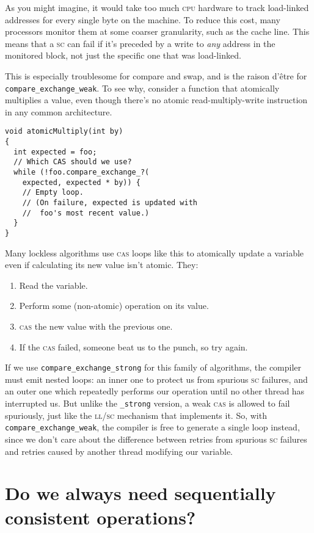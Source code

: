 \documentclass[fontsize=\bodyfontsize, numbers=endperiod]{scrartcl}
\newcommand{\codesize}{\fontsize{\bodyfontsize}{\bodybaselineskip}}
\newcommand{\monobox}[1]{\mbox{\texttt{#1}}}
\newenvironment{colfigure}
  {\par\vspace{1\baselineskip minus 0.5\baselineskip}\noindent\minipage{\linewidth}}
  {\endminipage\vspace{1\baselineskip minus 0.7\baselineskip}}
\begin{document}
\begin{multicols}{2}
As you might imagine, it would take too much \textsc{cpu} hardware to track
load-linked addresses for every single byte on the machine.
To reduce this cost, many processors monitor them at some coarser granularity,
such as the cache line.
This means that a \textsc{sc}
can fail if it's preceded by a write to \emph{any} address in the monitored block,
not just the specific one that was load-linked.

This is especially troublesome for compare and swap,
and is the raison d'être for \monobox{compare\_exchange\_weak}.
To see why, consider a function that atomically multiplies a value,
even though there's no atomic read-multiply-write instruction in any
common architecture.
\begin{colfigure}
\begin{verbatim}
void atomicMultiply(int by)
{
  int expected = foo;
  // Which CAS should we use?
  while (!foo.compare_exchange_?(
    expected, expected * by)) {
    // Empty loop.
    // (On failure, expected is updated with
    //  foo's most recent value.)
  }
}
\end{verbatim}
\end{colfigure}
Many lockless algorithms use \textsc{cas} loops like this to atomically update
a variable even if calculating its new value isn't atomic. They:
\begin{enumerate}
\item Read the variable.
\item Perform some (non-atomic) operation on its value.
\item \textsc{cas} the new value with the previous one.
\item If the \textsc{cas} failed, someone beat us to the punch, so try again.
\end{enumerate}
If we use \monobox{compare\_exchange\_strong} for this family of algorithms,
the compiler must emit nested loops:
an inner one to protect us from spurious \textsc{sc} failures,
and an outer one which repeatedly performs our operation until no other thread
has interrupted us.
But unlike the \monobox{\_strong} version, a weak \textsc{cas}
is allowed to fail spuriously, just like the \textsc{ll/sc} mechanism
that implements it.
So, with \monobox{compare\_exchange\_weak},
the compiler is free to generate a single loop instead,
since we don't care about the difference between retries from spurious
\textsc{sc} failures and retries caused by another thread modifying our variable.

\section{Do we always need sequentially consistent operations?}
\label{lock-example}


\end{multicols}
\end{document}
